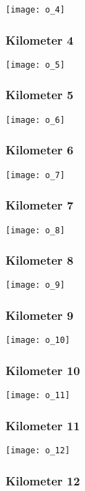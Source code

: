 \documentclass[]{article}
\begin{document}
\texttt{[image: o\_4]}

\subsubsection{Kilometer 4}\label{kilometer-4-14}

\texttt{[image: o\_5]}

\subsubsection{Kilometer 5}\label{kilometer-5-14}

\texttt{[image: o\_6]}

\subsubsection{Kilometer 6}\label{kilometer-6-11}

\texttt{[image: o\_7]}

\subsubsection{Kilometer 7}\label{kilometer-7-8}

\texttt{[image: o\_8]}

\subsubsection{Kilometer 8}\label{kilometer-8-4}

\texttt{[image: o\_9]}

\subsubsection{Kilometer 9}\label{kilometer-9-3}

\texttt{[image: o\_10]}

\subsubsection{Kilometer 10}\label{kilometer-10-3}

\texttt{[image: o\_11]}

\subsubsection{Kilometer 11}\label{kilometer-11}

\texttt{[image: o\_12]}

\subsubsection{Kilometer 12}\label{kilometer-12}
\end{document}
